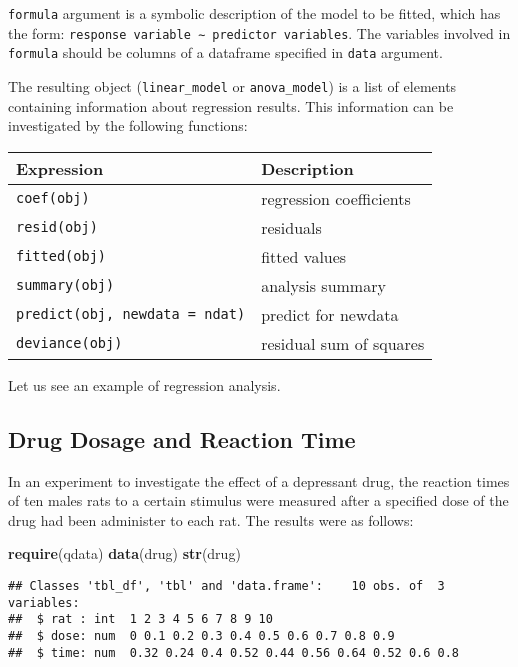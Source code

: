 \documentclass[]{book}
\newenvironment{Shaded}{\begin{snugshade}}{\end{snugshade}}
\newcommand{\KeywordTok}[1]{\textcolor[rgb]{0.13,0.29,0.53}{\textbf{{#1}}}}
\newcommand{\NormalTok}[1]{{#1}}
\begin{document}
\texttt{formula} argument is a symbolic description of the model to be
fitted, which has the form:
\texttt{response\ variable\ ∼\ predictor\ variables}. The variables
involved in \texttt{formula} should be columns of a dataframe specified
in \texttt{data} argument.

The resulting object (\texttt{linear\_model} or \texttt{anova\_model})
is a list of elements containing information about regression results.
This information can be investigated by the following functions:

\begin{longtable}[]{@{}ll@{}}
\toprule
Expression & Description\tabularnewline
\midrule
\endhead
\texttt{coef(obj)} & regression coefficients\tabularnewline
\texttt{resid(obj)} & residuals\tabularnewline
\texttt{fitted(obj)} & fitted values\tabularnewline
\texttt{summary(obj)} & analysis summary\tabularnewline
\texttt{predict(obj,\ newdata\ =\ ndat)} & predict for
newdata\tabularnewline
\texttt{deviance(obj)} & residual sum of squares\tabularnewline
\bottomrule
\end{longtable}

Let us see an example of regression analysis.

\clearpage

\subsection{Drug Dosage and Reaction
Time}\label{drug-dosage-and-reaction-time}

In an experiment to investigate the effect of a depressant drug, the
reaction times of ten males rats to a certain stimulus were measured
after a specified dose of the drug had been administer to each rat. The
results were as follows:

\begin{Shaded}
\begin{Highlighting}[]
\KeywordTok{require}\NormalTok{(qdata)}
\KeywordTok{data}\NormalTok{(drug)}
\KeywordTok{str}\NormalTok{(drug)}
\end{Highlighting}
\end{Shaded}

\begin{verbatim}
## Classes 'tbl_df', 'tbl' and 'data.frame':    10 obs. of  3 variables:
##  $ rat : int  1 2 3 4 5 6 7 8 9 10
##  $ dose: num  0 0.1 0.2 0.3 0.4 0.5 0.6 0.7 0.8 0.9
##  $ time: num  0.32 0.24 0.4 0.52 0.44 0.56 0.64 0.52 0.6 0.8
\end{verbatim}
\end{document}
